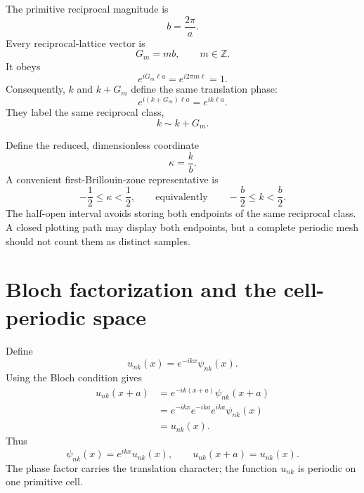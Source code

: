 The primitive reciprocal magnitude is
\begin{equation}
  b=\frac{2\pi}{a}.
  \label{eq:training-geometry-one-dimensional-reciprocal}
\end{equation}
Every reciprocal-lattice vector is
\begin{equation}
  G_m=mb,
  \qquad m\in\mathbb Z.
  \label{eq:training-bloch-1d-reciprocal-vector}
\end{equation}
It obeys
\begin{equation}
  e^{iG_m\ell a}=e^{i2\pi m\ell}=1.
\end{equation}
Consequently, $k$ and $k+G_m$ define the same translation phase:
\begin{equation}
  e^{i(k+G_m)\ell a}=e^{ik\ell a}.
\end{equation}
They label the same reciprocal class,
\begin{equation}
  k\sim k+G_m.
  \label{eq:training-bloch-1d-equivalence}
\end{equation}

Define the reduced, dimensionless coordinate
\begin{equation}
  \kappa=\frac{k}{b}.
  \label{eq:training-geometry-reduced-momentum}
\end{equation}
A convenient first-Brillouin-zone representative is
\begin{equation}
  -\frac12\leq\kappa<\frac12,
  \qquad\text{equivalently}\qquad
  -\frac b2\leq k<\frac b2.
  \label{eq:training-geometry-first-brillouin-zone}
\end{equation}
The half-open interval avoids storing both endpoints of the same reciprocal
class. A closed plotting path may display both endpoints, but a complete
periodic mesh should not count them as distinct samples.

\section{Bloch factorization and the cell-periodic space}

Define
\begin{equation}
  u_{nk}(x)=e^{-ikx}\psi_{nk}(x).
\end{equation}
Using the Bloch condition gives
\begin{align}
  u_{nk}(x+a)
  &=e^{-ik(x+a)}\psi_{nk}(x+a)\\
  &=e^{-ikx}e^{-ika}e^{ika}\psi_{nk}(x)\\
  &=u_{nk}(x).
\end{align}
Thus
\begin{equation}
  \psi_{nk}(x)=e^{ikx}u_{nk}(x),
  \qquad
  u_{nk}(x+a)=u_{nk}(x).
  \label{eq:training-geometry-bloch-factorization}
\end{equation}
The phase factor carries the translation character; the function $u_{nk}$ is
periodic on one primitive cell.

